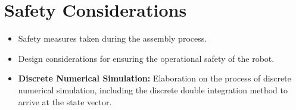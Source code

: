 \section{Safety Considerations}
\begin{itemize}
	\item Safety measures taken during the assembly process.
	\item Design considerations for ensuring the operational safety of the robot.
\end{itemize}
\begin{itemize}
	\item \textbf{Discrete Numerical Simulation:} Elaboration on the process of discrete numerical simulation, including the discrete double integration method to arrive at the state vector.
\end{itemize}
